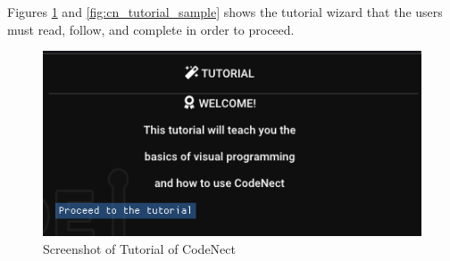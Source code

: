 \parx
Figures \ref{fig:cn_tutorial} and \ref{fig:cn_tutorial_sample} shows the tutorial wizard
that the users must read, follow, and complete in order to proceed.

\begin{figure}[H]
	\centering
	\captionsetup{justification=centering}
	\captionsetup[figure]{list=yes}
	\includegraphics[width=\linewidth]{media/sc_tutorial.png}
	\caption[Screenshot of Tutorial of CodeNect]{Screenshot of Tutorial of CodeNect}
	\label{fig:cn_tutorial}
\end{figure}


